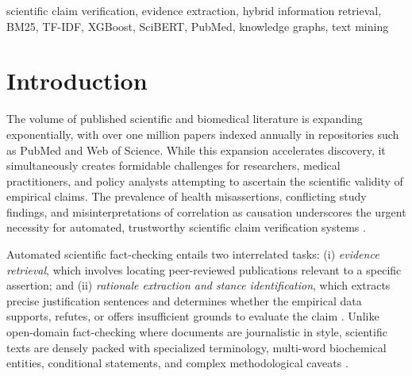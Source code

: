 \documentclass[conference]{IEEEtran}
\begin{document}
\begin{IEEEkeywords}
scientific claim verification, evidence extraction, hybrid information retrieval, BM25, TF-IDF, XGBoost, SciBERT, PubMed, knowledge graphs, text mining
\end{IEEEkeywords}

\section{Introduction}

The volume of published scientific and biomedical literature is expanding exponentially, with over one million papers indexed annually in repositories such as PubMed and Web of Science. While this expansion accelerates discovery, it simultaneously creates formidable challenges for researchers, medical practitioners, and policy analysts attempting to ascertain the scientific validity of empirical claims. The prevalence of health misassertions, conflicting study findings, and misinterpretations of correlation as causation underscores the urgent necessity for automated, trustworthy scientific claim verification systems \cite{wadden2020scifact}.

Automated scientific fact-checking entails two interrelated tasks: (i) \textit{evidence retrieval}, which involves locating peer-reviewed publications relevant to a specific assertion; and (ii) \textit{rationale extraction and stance identification}, which extracts precise justification sentences and determines whether the empirical data supports, refutes, or offers insufficient grounds to evaluate the claim \cite{thorne2018fever}. Unlike open-domain fact-checking where documents are journalistic in style, scientific texts are densely packed with specialized terminology, multi-word biochemical entities, conditional statements, and complex methodological caveats \cite{vladika2023scientific}.
\end{document}
